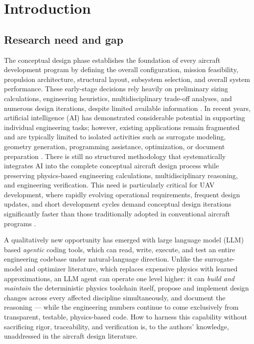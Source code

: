 \section{Introduction}
\label{sec:intro}

\subsection{Research need and gap}

The conceptual design phase establishes the foundation of every
aircraft development program by defining the overall configuration,
mission feasibility, propulsion architecture, structural layout,
subsystem selection, and overall system performance. These early-stage
decisions rely heavily on preliminary sizing calculations, engineering
heuristics, multidisciplinary trade-off analyses, and numerous design
iterations, despite limited available information
\citep{corrado2022,karali2024surrogate}. In recent years, artificial
intelligence (AI) has demonstrated considerable potential in supporting
individual engineering tasks; however, existing applications remain
fragmented and are typically limited to isolated activities such as
surrogate modeling, geometry generation, programming assistance,
optimization, or document preparation
\citep{karali2024mdo,du2026,pliakos2025}. There is still no structured
methodology that systematically integrates AI into the complete
conceptual aircraft design process while preserving physics-based
engineering calculations, multidisciplinary reasoning, and engineering
verification. This need is particularly critical for UAV development,
where rapidly evolving operational requirements, frequent design
updates, and short development cycles demand conceptual design
iterations significantly faster than those traditionally adopted in
conventional aircraft programs \citep{karali2023,shakeri2018}.

A qualitatively new opportunity has emerged with large language model
(LLM) based \emph{agentic} coding tools, which can read, write,
execute, and test an entire engineering codebase under natural-language
direction. Unlike the surrogate-model and optimizer literature, which
replaces expensive physics with learned approximations, an LLM agent
can operate one level higher: it can \emph{build and maintain} the
deterministic physics toolchain itself, propose and implement design
changes across every affected discipline simultaneously, and document
the reasoning --- while the engineering numbers continue to come
exclusively from transparent, testable, physics-based code. How to
harness this capability without sacrificing rigor, traceability, and
verification is, to the authors' knowledge, unaddressed in the aircraft
design literature.

